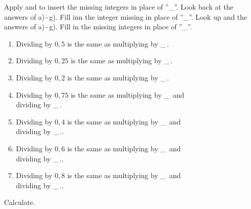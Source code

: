 Apply  and  to insert the missing integers in place of ''\_''.
Look back at the answers of a)\,-\,g). Fill inn the integer missing in place of ''\_''.
\newpage
{}
Look up  and the answers of a)\,-\,g).
Fill in the missing integers in place of ''\_''.
{\renewcommand{\labelenumi}{(\alph{enumi})}
	\begin{enumerate}
		\item Dividing by $ 0,5 $ is the same as multiplying by \_\,.
		\item Dividing by $ 0,25 $ is the same as multiplying by \_\,.
		\item Dividing by $ 0,2 $ is the same as multiplying by \_\,.
		\item Dividing by $ 0,75 $ is the same as multiplying by \_\, and \\ dividing by \_\,.
		\item Dividing by $ 0,4 $ is the same as multiplying by \_\, and \\ dividing by \_\,..
		\item Dividing by $ 0,6 $ is the same as multiplying by \_\, and \\ dividing by \_\,..
		\item Dividing by $ 0,8 $ is the same as multiplying by \_\, and \\ dividing by \_\,..	
\end{enumerate} }

Calculate.\os
{}
\newpage



